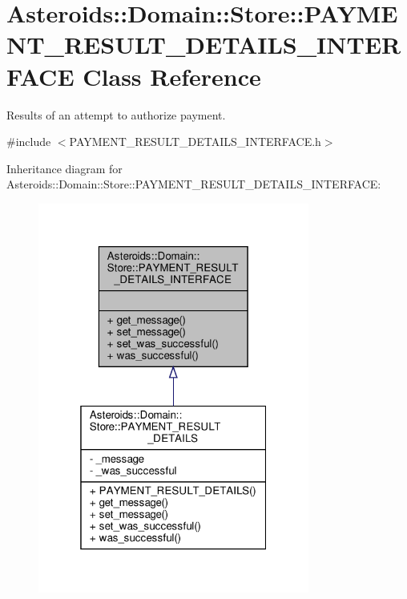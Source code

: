 \hypertarget{classAsteroids_1_1Domain_1_1Store_1_1PAYMENT__RESULT__DETAILS__INTERFACE}{}\section{Asteroids\+:\+:Domain\+:\+:Store\+:\+:P\+A\+Y\+M\+E\+N\+T\+\_\+\+R\+E\+S\+U\+L\+T\+\_\+\+D\+E\+T\+A\+I\+L\+S\+\_\+\+I\+N\+T\+E\+R\+F\+A\+CE Class Reference}
\label{classAsteroids_1_1Domain_1_1Store_1_1PAYMENT__RESULT__DETAILS__INTERFACE}


Results of an attempt to authorize payment.  




{\ttfamily \#include $<$P\+A\+Y\+M\+E\+N\+T\+\_\+\+R\+E\+S\+U\+L\+T\+\_\+\+D\+E\+T\+A\+I\+L\+S\+\_\+\+I\+N\+T\+E\+R\+F\+A\+C\+E.\+h$>$}



Inheritance diagram for Asteroids\+:\+:Domain\+:\+:Store\+:\+:P\+A\+Y\+M\+E\+N\+T\+\_\+\+R\+E\+S\+U\+L\+T\+\_\+\+D\+E\+T\+A\+I\+L\+S\+\_\+\+I\+N\+T\+E\+R\+F\+A\+CE\+:\nopagebreak
\begin{figure}[H]
\begin{center}
\leavevmode
\includegraphics[width=253pt]{classAsteroids_1_1Domain_1_1Store_1_1PAYMENT__RESULT__DETAILS__INTERFACE__inherit__graph}
\end{center}
\end{figure}


